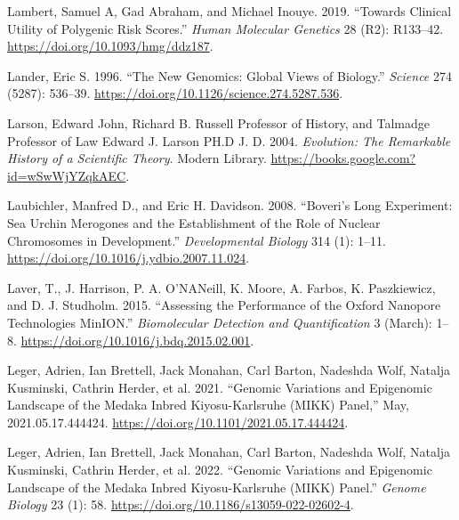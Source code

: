\documentclass[
]{book}
\newlength{\cslhangindent}
\newlength{\cslentryspacingunit} %
\newenvironment{CSLReferences}[2] %
 {%
  \setlength{\parindent}{0pt}
  \ifodd #1
  \let\oldpar\par
  \def\par{\hangindent=\cslhangindent\oldpar}
  \fi
  \setlength{\parskip}{#2\cslentryspacingunit}
 }%
 {}
\begin{document}
\begin{CSLReferences}{1}{0}
\leavevmode{}%
Lambert, Samuel A, Gad Abraham, and Michael Inouye. 2019. {``Towards Clinical Utility of Polygenic Risk Scores.''} \emph{Human Molecular Genetics} 28 (R2): R133--42. \url{https://doi.org/10.1093/hmg/ddz187}.

\leavevmode{}%
Lander, Eric S. 1996. {``The {New Genomics}: {Global Views} of {Biology}.''} \emph{Science} 274 (5287): 536--39. \url{https://doi.org/10.1126/science.274.5287.536}.

\leavevmode{}%
Larson, Edward John, Richard B. Russell Professor of History, and Talmadge Professor of Law Edward J. Larson PH.D J. D. 2004. \emph{Evolution: {The Remarkable History} of a {Scientific Theory}}. {Modern Library}. \url{https://books.google.com?id=wSwWjYZqkAEC}.

\leavevmode{}%
Laubichler, Manfred D., and Eric H. Davidson. 2008. {``Boveri's Long Experiment: {Sea} Urchin Merogones and the Establishment of the Role of Nuclear Chromosomes in Development.''} \emph{Developmental Biology} 314 (1): 1--11. \url{https://doi.org/10.1016/j.ydbio.2007.11.024}.

\leavevmode{}%
Laver, T., J. Harrison, P. A. O'NANeill, K. Moore, A. Farbos, K. Paszkiewicz, and D. J. Studholm. 2015. {``Assessing the Performance of the {Oxford Nanopore Technologies MinION}.''} \emph{Biomolecular Detection and Quantification} 3 (March): 1--8. \url{https://doi.org/10.1016/j.bdq.2015.02.001}.

\leavevmode{}%
Leger, Adrien, Ian Brettell, Jack Monahan, Carl Barton, Nadeshda Wolf, Natalja Kusminski, Cathrin Herder, et al. 2021. {``Genomic Variations and Epigenomic Landscape of the {Medaka Inbred Kiyosu-Karlsruhe} ({MIKK}) Panel,''} May, 2021.05.17.444424. \url{https://doi.org/10.1101/2021.05.17.444424}.

\leavevmode{}%
Leger, Adrien, Ian Brettell, Jack Monahan, Carl Barton, Nadeshda Wolf, Natalja Kusminski, Cathrin Herder, et al. 2022. {``Genomic Variations and Epigenomic Landscape of the {Medaka Inbred Kiyosu-Karlsruhe} ({MIKK}) Panel.''} \emph{Genome Biology} 23 (1): 58. \url{https://doi.org/10.1186/s13059-022-02602-4}.


\end{CSLReferences}
\end{document}
